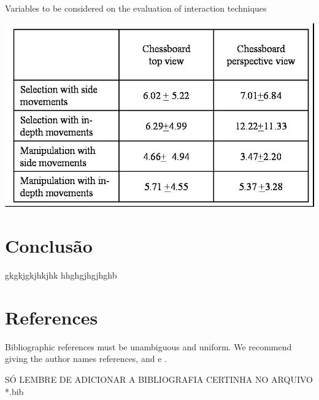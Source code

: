 \documentclass[12pt]{article}
\begin{document}
\begin{table}[ht]
\centering
\caption{Variables to be considered on the evaluation of interaction
  techniques}
\label{tab:exTable1}
\includegraphics[width=.7\textwidth]{table.jpg}
\end{table}

\section{Conclusão}

gkgkjgkjhkjhk
hhghgjhgjhghb

\section{References}

Bibliographic references must be unambiguous and uniform.  We recommend giving
the author names references, and \cite{smith:99} \cite{barbosa:97} e \cite{rau:11}.
\cite{kishimoto:08}

SÓ LEMBRE DE ADICIONAR A BIBLIOGRAFIA CERTINHA NO ARQUIVO *.bib



\end{document}
